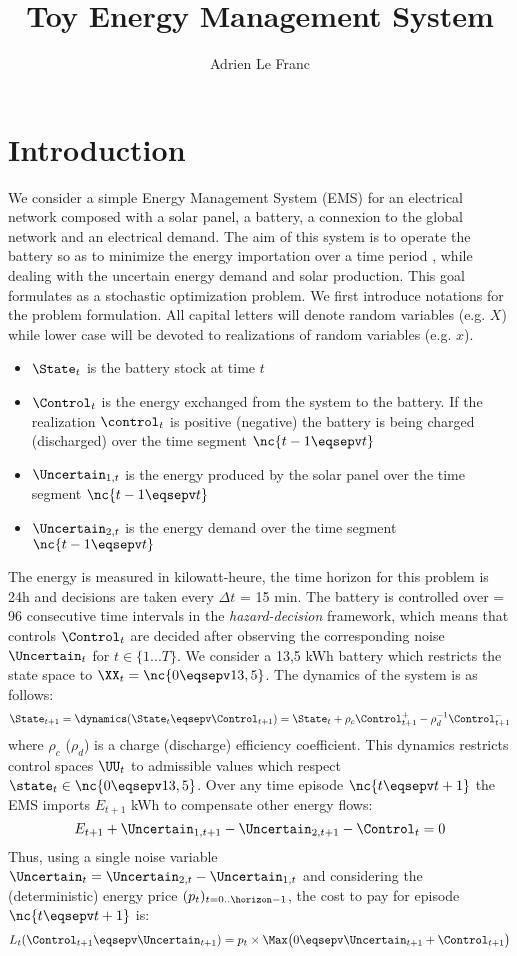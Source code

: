 \documentclass[10pt,a4paper]{article}
\begin{document}
	
\title{\textbf{Toy Energy Management System}}
\author{Adrien Le Franc}
\date{}
\maketitle

\section{Introduction}

We consider a simple Energy Management System (EMS) for an electrical network composed with a solar panel, a battery, a connexion to the global network and an electrical demand. The aim of this system is to operate the battery so as to minimize the energy importation over a time period \horizon, while dealing with the uncertain energy demand and solar production. This goal formulates as a stochastic optimization problem. We first introduce notations for the problem formulation. All capital letters will denote random variables (e.g. $X$) while lower case will be devoted to realizations of random variables (e.g. $x$).

\begin{itemize}
\item $\State_t$ is the battery stock at time $t$
\item $\Control_t$ is the energy exchanged from the system to the battery. If the realization $\control_t$ is positive (negative) the battery is being charged (discharged) over the time segment $\nc{t-1 \eqsepv t}$
\item $\Uncertain_{1, t}$ is the energy produced by the solar panel over the time segment $\nc{t-1 \eqsepv t}$
\item $\Uncertain_{2, t}$ is the energy demand over the time segment $\nc{t-1 \eqsepv t}$
\end{itemize}

\noindent The energy is measured in kilowatt-heure, the time horizon for this problem is 24h and decisions are taken every $\Delta t$ = 15 min. The battery is controlled over \horizon = 96 consecutive time intervals in the \textit{hazard-decision} framework, which means that controls $\Control_t$ are decided after observing the corresponding noise $\Uncertain_t$ for $t \in \{1...T\}$. We consider a 13,5 kWh battery which restricts the state space to $\XX_t = \nc{0 \eqsepv 13,5}$. The dynamics of the system is as follows:
\[\State_{t+1} =  \dynamics(\State_t \eqsepv \Control_{t+1}) = \State_t + \rho_c \Control_{t+1}^+ - \rho_d^{-1} \Control_{t+1}^-\]
where $\rho_c$ ($\rho_d$) is a charge (discharge) efficiency coefficient. This dynamics restricts control spaces $\UU_t$ to admissible values which respect $\state_t \in \nc{0 \eqsepv 13,5}$. Over any time episode $\nc{t \eqsepv t+1}$ the EMS imports $E_{t+1}$ kWh to compensate other energy flows:
\[E_{t+1} + \Uncertain_{1, t+1} - \Uncertain_{2, t+1} - \Control_t = 0\]
Thus, using a single noise variable $\Uncertain_t = \Uncertain_{2, t} - \Uncertain_{1, t}$ and considering the (deterministic) energy price $(p_t)_{t=0..\horizon-1}$, the cost to pay for episode $\nc{t \eqsepv t+1}$ is:
\[L_t(\Control_{t+1} \eqsepv \Uncertain_{t+1}) = p_t \times \Max \big(0 \eqsepv \Uncertain_{t+1} + \Control_{t+1} \big)\]
\end{document}
